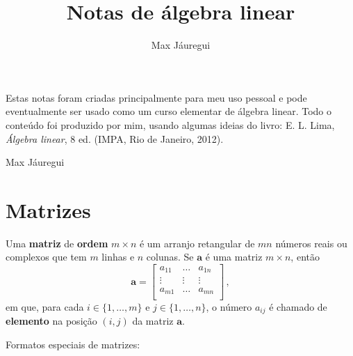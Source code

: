\documentclass[12pt,a4paper]{report}
\title{Notas de álgebra linear}
\author{Max Jáuregui}
\newcommand{\mb}{\mathbf}
\begin{document}
\maketitle
  Estas notas foram criadas principalmente para meu uso pessoal e pode eventualmente ser usado como um curso elementar de álgebra linear. Todo o conteúdo foi produzido por mim, usando algumas ideias do livro: E. L. Lima, \textit{Álgebra linear}, 8 ed. (IMPA, Rio de Janeiro, 2012).

  \begin{flushright}
    Max Jáuregui
  \end{flushright}
\tableofcontents

\chapter{Matrizes}

Uma \textbf{matriz} de \textbf{ordem} $m\times n$ é um arranjo retangular de $mn$ números reais ou complexos que tem $m$ linhas e $n$ colunas. Se $\mb{a}$ é uma matriz $m\times n$, então
$$\mb{a}=\begin{bmatrix}
  a_{11}&\ldots&a_{1n}\\
  \vdots&\vdots&\vdots\\
  a_{m1}&\ldots&a_{mn}\\
\end{bmatrix}\,,$$
em que, para cada $i\in\{1,\ldots,m\}$ e $j\in\{1,\ldots,n\}$, o número $a_{ij}$ é chamado de \textbf{elemento} na posição $(i,j)$ da matriz $\mb{a}$.

Formatos especiais de matrizes:
\end{document}
